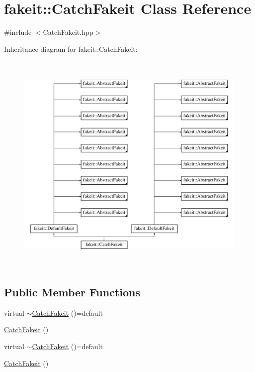 \hypertarget{classfakeit_1_1CatchFakeit}{}\section{fakeit\+::Catch\+Fakeit Class Reference}
\label{classfakeit_1_1CatchFakeit}


{\ttfamily \#include $<$Catch\+Fakeit.\+hpp$>$}

Inheritance diagram for fakeit\+::Catch\+Fakeit\+:\begin{figure}[H]
\begin{center}
\leavevmode
\includegraphics[height=11.000000cm]{classfakeit_1_1CatchFakeit}
\end{center}
\end{figure}
\subsection*{Public Member Functions}
\begin{DoxyCompactItemize}
\item 
virtual \mbox{\hyperlink{classfakeit_1_1CatchFakeit_a1cb16b9a46b9e687c65514f14186d2ac}{$\sim$\+Catch\+Fakeit}} ()=default
\item 
\mbox{\hyperlink{classfakeit_1_1CatchFakeit_a2f35962b2e2700b8065433088308193a}{Catch\+Fakeit}} ()
\item 
virtual \mbox{\hyperlink{classfakeit_1_1CatchFakeit_a1cb16b9a46b9e687c65514f14186d2ac}{$\sim$\+Catch\+Fakeit}} ()=default
\item 
\mbox{\hyperlink{classfakeit_1_1CatchFakeit_a2f35962b2e2700b8065433088308193a}{Catch\+Fakeit}} ()
\end{DoxyCompactItemize}
